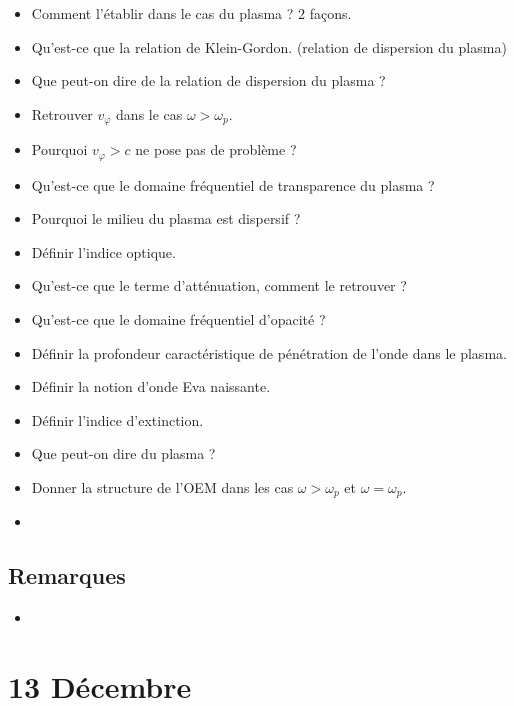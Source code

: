 \documentclass[a4paper, 11pt, hidelinks]{article}
\begin{document}
\begin{itemize}
    \item Comment l'établir dans le cas du plasma ? $2$ façons. \cite{Chapitre16}
    \item Qu'est-ce que la relation de Klein-Gordon. (relation de dispersion du plasma) \cite{Chapitre16}
    \item Que peut-on dire de la relation de dispersion du plasma ? \cite{Chapitre16}
    \item Retrouver $v_{\varphi}$ dans le cas $\omega > \omega_p$. \cite{Chapitre16}
    \item Pourquoi $v_{\varphi}>c$ ne pose pas de problème ? \cite{Chapitre16}
    \item Qu'est-ce que le domaine fréquentiel de transparence du plasma ? \cite{Chapitre16}
    \item Pourquoi le milieu du plasma est dispersif ? \cite{Chapitre16}
    \item Définir l'indice optique. \cite{Chapitre16}
    \item Qu'est-ce que le terme d'atténuation, comment le retrouver ? \cite{Chapitre16}
    \item Qu'est-ce que le domaine fréquentiel d'opacité ? \cite{Chapitre16}
    \item Définir la profondeur caractéristique de pénétration de l'onde dans le plasma. \cite{Chapitre16}
    \item Définir la notion d'onde Eva naissante. \cite{Chapitre16}
    \item Définir l'indice d'extinction. \cite{Chapitre16}
    \item Que peut-on dire du plasma ? \cite{Chapitre16}
    \item Donner la structure de l'OEM dans les cas $\omega > \omega_p$ et $\omega=\omega_p$. \cite{Chapitre16}
    \item 
\end{itemize}


\subsection{Remarques}



\begin{itemize}
    \item 
\end{itemize}



\section{13 Décembre}
\end{document}
